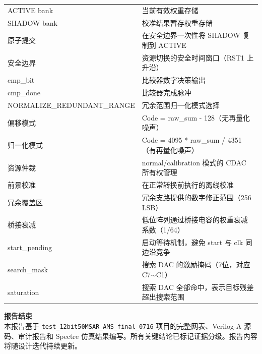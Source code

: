 \documentclass[UTF8,a4paper,11pt]{ctexart}
\begin{document}
\begin{table}[H]
\begin{tabular}{p{4cm}p{9cm}}
ACTIVE bank                   & 当前有效权重存储 \\
SHADOW bank                   & 校准结果暂存权重存储 \\
原子提交                       & 在安全边界一次性将 SHADOW 复制到 ACTIVE \\
安全边界                       & 资源切换的安全时间窗口（RST1 上升沿） \\
cmp\_bit                      & 比较器数字决策输出 \\
cmp\_done                     & 比较器完成脉冲 \\
NORMALIZE\_REDUNDANT\_RANGE  & 冗余范围归一化模式选择 \\
偏移模式                       & Code = raw\_sum - 128（无再量化噪声） \\
归一化模式                     & Code = 4095 * raw\_sum / 4351（有再量化噪声） \\
资源仲裁                       & normal/calibration 模式的 CDAC 所有权管理 \\
前景校准                       & 在正常转换前执行的离线校准 \\
冗余覆盖区                     & 冗余支路提供的数字修正范围（256 LSB） \\
桥接衰减                       & 低位阵列通过桥接电容的权重衰减系数（1/64） \\
start\_pending                & 启动等待机制，避免 start 与 clk 同边沿竞争 \\
search\_mask                  & 搜索 DAC 的激励掩码（7位，对应 C7$\sim$C1） \\
saturation                    & 搜索 DAC 全部命中，表示目标残差超出搜索范围 \\
\bottomrule
\end{tabular}
\end{table}

\vspace{1cm}

\begin{infobox}
\textbf{报告结束}\\[4pt]
本报告基于 \texttt{test\_12bit50MSAR\_AMS\_final\_0716} 项目的完整网表、Verilog-A 源码、审计报告和 Spectre 仿真结果编写。所有关键结论已标记证据分级。报告内容将随设计迭代持续更新。
\end{infobox}
\end{document}

